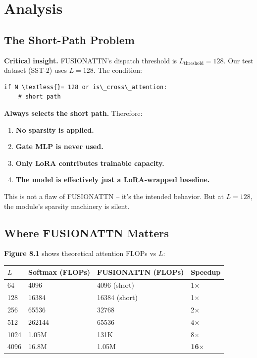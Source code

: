 \section{Analysis}

\subsection{The Short-Path Problem}

\textbf{Critical insight.} FUSIONATTN's dispatch threshold is $L_\text{threshold} = 128$. 
Our test dataset (SST-2) uses $L = 128$. The condition:

\begin{lstlisting}
if N \textless{}= 128 or is\_cross\_attention:
    # short path
\end{lstlisting}

\textbf{Always selects the short path.} Therefore:

\begin{enumerate}
\item \textbf{No sparsity is applied.}
\item \textbf{Gate MLP is never used.}
\item \textbf{Only LoRA contributes trainable capacity.}
\item \textbf{The model is effectively just a LoRA-wrapped baseline.}

\end{enumerate}
This is not a flaw of FUSIONATTN -- it's the intended behavior. But at 
$L = 128$, the module's sparsity machinery is silent.

\subsection{Where FUSIONATTN Matters}

\textbf{Figure 8.1} shows theoretical attention FLOPs vs $L$:

\begin{table}[H]
\centering
\small
\begin{tabular}{llll}
\toprule
\textbf{$L$} & \textbf{Softmax (FLOPs)} & \textbf{FUSIONATTN (FLOPs)} & \textbf{Speedup} \\
\midrule
64 & 4096 & 4096 (short) & 1$\times$ \\
128 & 16384 & 16384 (short) & 1$\times$ \\
256 & 65536 & 32768 & 2$\times$ \\
512 & 262144 & 65536 & 4$\times$ \\
1024 & 1.05M & 131K & 8$\times$ \\
4096 & 16.8M & 1.05M & \textbf{16$\times$} \\
\bottomrule
\end{tabular}
\end{table}


